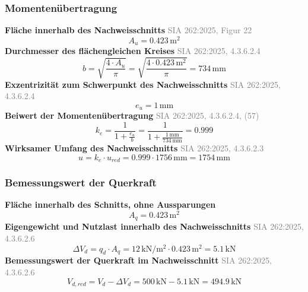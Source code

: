 \documentclass[11pt,a4paper]{article}
\newcommand{\normref}[1]{{\small\textcolor{gray}{#1}}}
\begin{document}
\subsubsection{Momentenübertragung}
\noindent\textbf{Fläche innerhalb des Nachweisschnitts} \hfill \normref{SIA 262:2025, Figur 22}
\begin{equation*}
A_u = 0.423\,\mathrm{m}^{2}
\end{equation*}
\noindent\textbf{Durchmesser des flächengleichen Kreises} \hfill \normref{SIA 262:2025, 4.3.6.2.4}
\begin{equation*}
b = \sqrt{\frac{4 \cdot A_u}{\pi}} = \sqrt{\frac{4 \cdot 0.423\,\mathrm{m}^{2}}{\pi}} = 734\,\mathrm{mm}
\end{equation*}
\noindent\textbf{Exzentrizität zum Schwerpunkt des Nachweisschnitts} \hfill \normref{SIA 262:2025, 4.3.6.2.4}
\begin{equation*}
e_u = 1\,\mathrm{mm}
\end{equation*}
\noindent\textbf{Beiwert der Momentenübertragung} \hfill \normref{SIA 262:2025, 4.3.6.2.4, (57)}
\begin{equation*}
k_e = \frac{1}{1 + \frac{e_u}{b}} = \frac{1}{1 + \frac{1\,\mathrm{mm}}{734\,\mathrm{mm}}} = 0.999
\end{equation*}
\noindent\textbf{Wirksamer Umfang des Nachweisschnitts} \hfill \normref{SIA 262:2025, 4.3.6.2.3}
\begin{equation*}
u = k_e \cdot u_{red} = 0.999 \cdot 1756\,\mathrm{mm} = 1754\,\mathrm{mm}
\end{equation*}
\subsubsection{Bemessungswert der Querkraft}
\noindent\textbf{Fläche innerhalb des Schnitts, ohne Aussparungen}
\begin{equation*}
A_q = 0.423\,\mathrm{m}^{2}
\end{equation*}
\noindent\textbf{Eigengewicht und Nutzlast innerhalb des Nachweisschnitts} \hfill \normref{SIA 262:2025, 4.3.6.2.6}
\begin{equation*}
\Delta V_d = q_d \cdot A_q = 12\,\mathrm{kN}/\mathrm{m}^{2} \cdot 0.423\,\mathrm{m}^{2} = 5.1\,\mathrm{kN}
\end{equation*}
\noindent\textbf{Bemessungswert der Querkraft im Nachweisschnitt} \hfill \normref{SIA 262:2025, 4.3.6.2.6}
\begin{equation*}
V_{d,red} = V_d - \Delta V_d = 500\,\mathrm{kN} - 5.1\,\mathrm{kN} = 494.9\,\mathrm{kN}
\end{equation*}
\end{document}
